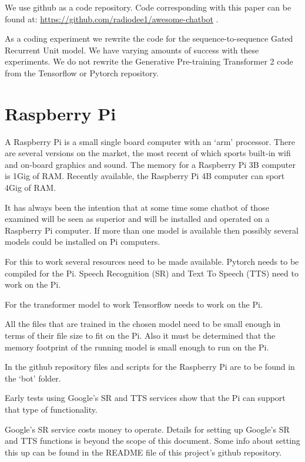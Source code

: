 We use github as a code repository. Code corresponding with this paper can be found at: \href{https://github.com/radiodee1/awesome-chatbot}{https://github.com/radiodee1/awesome-chatbot}
. 

As a coding experiment we rewrite the code for the sequence-to-sequence Gated Recurrent Unit model. We have varying amounts of success with these experiments. We do not rewrite the Generative Pre-training Transformer 2 code from the Tensorflow or Pytorch repository.


\section{Raspberry Pi}

A Raspberry Pi is a small single board computer with an `arm' processor. There are 
several versions on the market, the most recent of which sports built-in wifi and
on-board graphics and sound. The memory for a Raspberry Pi 3B computer is 1Gig of RAM. Recently
available, the Raspberry Pi 4B computer can sport 4Gig of RAM.

It has always been the intention that at some time some chatbot of
those examined will be seen as superior and will be installed and
operated on a Raspberry Pi computer. If more than one model is available
then possibly several models could be installed on Pi computers.

For this to work several resources need to be made available. Pytorch
needs to be compiled for the Pi. Speech Recognition (\ac{SR}) and Text
To Speech (TTS) need to work on the Pi.

For the transformer model to work Tensorflow needs to work on the Pi.

All the files that are trained in the chosen model need to be small
enough in terms of their file size to fit on the Pi. Also it must
be determined that the memory footprint of the running model is small
enough to run on the Pi.

In the github repository files and scripts for the Raspberry Pi are
to be found in the \textquoteleft bot\textquoteright{} folder.

Early tests using Google\textquoteright s SR and TTS services show
that the Pi can support that type of functionality. 

Google's SR service costs money to operate. Details
for setting up Google's SR and TTS functions is beyond
the scope of this document. Some info about setting this up can be
found in the README file of this project\textquoteright s github
repository.

